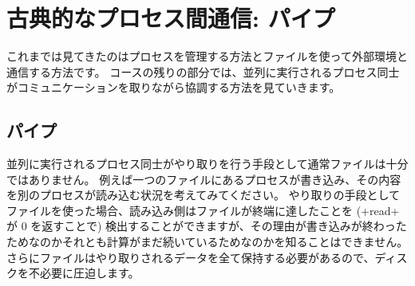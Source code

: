 %
%

\chapter{\label{sec/pipes}古典的なプロセス間通信: パイプ}


これまでは見てきたのはプロセスを管理する方法とファイルを使って外部環境と通信する方法です。
コースの残りの部分では、並列に実行されるプロセス同士がコミュニケーションを取りながら協調する方法を見ていきます。

\section{パイプ}

並列に実行されるプロセス同士がやり取りを行う手段として通常ファイルは十分ではありません。
例えば一つのファイルにあるプロセスが書き込み、その内容を別のプロセスが読み込む状況を考えてみてください。
やり取りの手段としてファイルを使った場合、読み込み側はファイルが終端に達したことを (\ml+read+ が 0 を返すことで)
検出することができますが、その理由が書き込みが終わったためなのかそれとも計算がまだ続いているためなのかを知ることはできません。
さらにファイルはやり取りされるデータを全て保持する必要があるので、ディスクを不必要に圧迫します。

